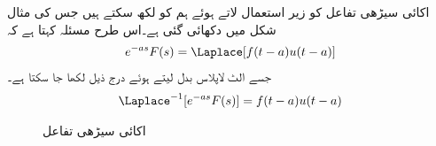 اکائی سیڑھی تفاعل کو زیر استعمال لاتے ہوئے ہم  کو  لکھ سکتے ہیں جس کی مثال شکل  میں دکھائی گئی ہے۔اس طرح مسئلہ   کہتا ہے کہ
\begin{align}\label{مساوات_لاپلاس_منتقلی_وقت_صورت_الف}
e^{-as}F(s)=\Laplace[f(t-a)u(t-a)]
\end{align}
جسے الٹ لاپلاس بدل لیتے ہوئے درج ذیل لکھا جا سکتا ہے۔
\begin{align}\label{مساوات_لاپلاس_منتقلی_وقت_صورت_ب}
\Laplace^{-1}[e^{-as}F(s)]=f(t-a)u(t-a)
\end{align}
%
\begin{figure}
\centering
{}
\caption{اکائی سیڑھی تفاعل }
\label{شکل_لاپلاس_اکائی_سیڑھی_تفاعل}
\end{figure}
%
